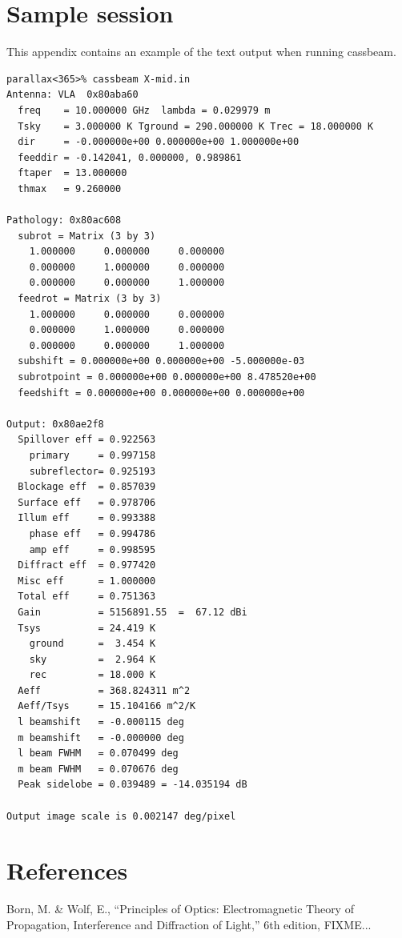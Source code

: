 \documentclass{article}
\begin{document}
\section{Sample session} \label{apx:sampout}

This appendix contains an example of the text output when running cassbeam.

\begin{verbatim}
parallax<365>% cassbeam X-mid.in
Antenna: VLA  0x80aba60
  freq    = 10.000000 GHz  lambda = 0.029979 m
  Tsky    = 3.000000 K Tground = 290.000000 K Trec = 18.000000 K
  dir     = -0.000000e+00 0.000000e+00 1.000000e+00
  feeddir = -0.142041, 0.000000, 0.989861
  ftaper  = 13.000000
  thmax   = 9.260000

Pathology: 0x80ac608
  subrot = Matrix (3 by 3)
    1.000000     0.000000     0.000000 
    0.000000     1.000000     0.000000 
    0.000000     0.000000     1.000000 
  feedrot = Matrix (3 by 3)
    1.000000     0.000000     0.000000 
    0.000000     1.000000     0.000000 
    0.000000     0.000000     1.000000 
  subshift = 0.000000e+00 0.000000e+00 -5.000000e-03
  subrotpoint = 0.000000e+00 0.000000e+00 8.478520e+00
  feedshift = 0.000000e+00 0.000000e+00 0.000000e+00

Output: 0x80ae2f8
  Spillover eff = 0.922563
    primary     = 0.997158
    subreflector= 0.925193
  Blockage eff  = 0.857039
  Surface eff   = 0.978706
  Illum eff     = 0.993388
    phase eff   = 0.994786
    amp eff     = 0.998595
  Diffract eff  = 0.977420
  Misc eff      = 1.000000
  Total eff     = 0.751363
  Gain          = 5156891.55  =  67.12 dBi
  Tsys          = 24.419 K
    ground      =  3.454 K
    sky         =  2.964 K
    rec         = 18.000 K
  Aeff          = 368.824311 m^2
  Aeff/Tsys     = 15.104166 m^2/K
  l beamshift   = -0.000115 deg
  m beamshift   = -0.000000 deg
  l beam FWHM   = 0.070499 deg
  m beam FWHM   = 0.070676 deg
  Peak sidelobe = 0.039489 = -14.035194 dB

Output image scale is 0.002147 deg/pixel
\end{verbatim}

\section{References}

\noindent
Born, M. \& Wolf, E., ``Principles of Optics: Electromagnetic Theory of
Propagation, Interference and Diffraction of Light,'' 6th edition, FIXME...

\vspace{10pt}
\end{document}
